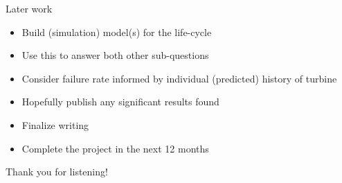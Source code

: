 \documentclass{beamer}
\begin{document}
\begin{frame}{Later work}
\begin{itemize}
\item Build (simulation) model(s) for the life-cycle
\item Use this to answer both other sub-questions
\item Consider failure rate informed by individual (predicted) history of turbine
\end{itemize}

\bigskip

\begin{itemize}
\item Hopefully publish any significant results found
\item Finalize writing
\item Complete the project in the next 12 months
\end{itemize}

\bigskip

\pause
\begin{center}
 Thank you for listening!
\end{center}
\end{frame}
\end{document}
